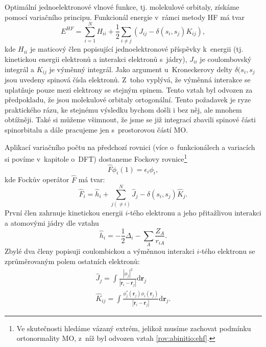 Optimální jednoelektronové vlnové funkce, tj. molekulové orbitaly, získáme pomocí variačního principu. Funkcionál energie v~rámci metody HF má tvar 
\begin{equation}
E^{HF}= \sum_{i=1}^N H_{ii}+ \frac{1}{2}\sum_{i\neq j} (J_{ij}-\delta(s_{i},s_{j})K_{ij}),
\label{rov:abinitio:ehf}
\end{equation}
kde $H_{ii}$ je maticový člen popisující jednoelektronové příspěvky k~energii (tj. kinetickou energii elektronů a interakci elektronů s~jádry), $J_{ii}$ je coulombovský integrál a $K_{ij}$ je výměnný integrál.
Jako argument u~Kroneckerovy delty $\delta(s_{i},s_{j}$ jsou uvedeny spinová čísla elektronů. Z~toho vyplývá, že výměnná interakce se uplatňuje pouze mezi elektrony se stejným spinem.
Tento vztah byl odvozen za předpokladu, že jsou molekulové orbitaly ortogonální. Tento požadavek je ryze praktického rázu, ke stejnému výsledku bychom došli i bez něj, ale mnohem obtížněji. Také si můžeme všimnout, že jsme se již integrací zbavili spinové části spinorbitalu a dále pracujeme jen s~prostorovou částí MO.

Aplikací variačního počtu na předchozí rovnici (více o~funkcionálech a variacích si povíme v~kapitole o~DFT) dostaneme Fockovy rovnice\footnote{Ve skutečnosti hledáme vázaný extrém, jelikož musíme zachovat podmínku ortonormality MO, z~níž byl odvozen vztah \ref{rov:abinitio:ehf}.} 
\begin{equation}
\hat{F}\phi_i(1) = \epsilon_i \phi_i ,
\label{rov:abinitio:fockrov}  
\end{equation}
kde Fockův operátor $\hat{F}$ má tvar:
\begin{equation}
\hat{F}_i = \hat{h}_i+\sum^N_{j(\neq i)} \hat{J}_j - \delta(s_i,s_j) \hat{K}_j .
\label{rov:abinitio:fockoper}
\end{equation}
První člen zahrnuje  kinetickou energii $i$-tého elektronu a jeho přitažlivou interakci a atomovými jádry dle vztahu
\begin{equation}
\hat{h}_i = -\frac{1}{2}\Delta_i - \sum_{A}\frac{Z_A}{r_{iA}} .
\end{equation}
Zbylé dva členy popisuji coulombickou a výměnnou interakci $i$-tého elektronu se zprůměrovaným polem ostatních elektronů:
\begin{eqnarray}
\hat{J}_j=\int \frac{|\phi_j |^2}{|\textbf{r}_{i}-\textbf{r}_{j}|}\mathrm{d}\textbf{r}_j \\
\hat{K}_{ij} = \int \frac{\phi_j^*(\mathbf{r}_j)\phi_i(\mathbf{r}_j)}{|\textbf{r}_{i}-\textbf{r}_{j}|}\mathrm{d}\textbf{r}_j .
\end{eqnarray}

